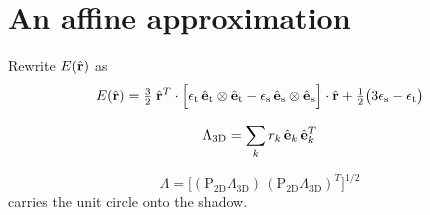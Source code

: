 \section{An affine approximation}

Rewrite $E(\hat{\mathbf r})$ as
\begin{equation}
  E(\uvecr) = \tfrac32\;\uvecr^{T}\cdot
  \Big[ \etide\, \uvectide\otimes\uvectide
      - \espin\,\uvecspin\otimes\uvecspin \Big]
  \cdot\uvecr + \tfrac12\bigl(3\espin - \etide\bigr)
\end{equation}

\begin{equation}
  \Lambda_{\mathrm{3D}} = \sum_k r_k \, \uvece_k \, \uvece_k^{T}
  \label{eq:deformation-stretch-3d}
\end{equation}

\begin{equation}
  \Lambda = \Big[
    (\mathrm{P_{2D}} \Lambda_{\mathrm{3D}}) \,
    (\mathrm{P_{2D}} \Lambda_{\mathrm{3D}})^T
    \Big]^{1/2}
  \label{eq:deformation-stretch}
\end{equation}
carries the unit circle onto the shadow.

